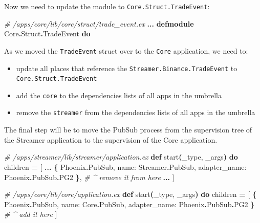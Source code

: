 \documentclass[
  oneside]{book}
\newenvironment{Shaded}{\begin{snugshade}}{\end{snugshade}}
\newcommand{\CommentTok}[1]{\textcolor[rgb]{0.56,0.35,0.01}{\textit{#1}}}
\newcommand{\ConstantTok}[1]{\textcolor[rgb]{0.56,0.35,0.01}{#1}}
\newcommand{\FunctionTok}[1]{\textcolor[rgb]{0.13,0.29,0.53}{\textbf{#1}}}
\newcommand{\KeywordTok}[1]{\textcolor[rgb]{0.13,0.29,0.53}{\textbf{#1}}}
\newcommand{\NormalTok}[1]{#1}
\newcommand{\OperatorTok}[1]{\textcolor[rgb]{0.81,0.36,0.00}{\textbf{#1}}}
\newcommand{\OtherTok}[1]{\textcolor[rgb]{0.56,0.35,0.01}{#1}}
\newcommand{\VariableTok}[1]{\textcolor[rgb]{0.00,0.00,0.00}{#1}}
\providecommand{\tightlist}{%
  \setlength{\itemsep}{0pt}\setlength{\parskip}{0pt}}
\begin{document}
Now we need to update the module to \texttt{Core.Struct.TradeEvent}:

\begin{Shaded}
\begin{Highlighting}[]
\CommentTok{\# /apps/core/lib/core/struct/trade\_event.ex}
\OperatorTok{...}
\KeywordTok{defmodule} \ConstantTok{Core}\OperatorTok{.}\ConstantTok{Struct}\OperatorTok{.}\ConstantTok{TradeEvent} \KeywordTok{do}
\end{Highlighting}
\end{Shaded}

As we moved the \texttt{TradeEvent} struct over to the \texttt{Core} application, we need to:

\begin{itemize}
\tightlist
\item
  update all places that reference the \texttt{Streamer.Binance.TradeEvent} to \texttt{Core.Struct.TradeEvent}
\item
  add the \texttt{core} to the dependencies lists of all apps in the umbrella
\item
  remove the \texttt{streamer} from the dependencies lists of all apps in the umbrella
\end{itemize}

The final step will be to move the PubSub process from the supervision tree of the Streamer application to the supervision of the Core application.

\begin{Shaded}
\begin{Highlighting}[]
\CommentTok{\# /apps/streamer/lib/streamer/application.ex}
  \KeywordTok{def}\NormalTok{ start}\FunctionTok{(}\NormalTok{\_type, \_args}\FunctionTok{)} \KeywordTok{do}
\NormalTok{    children }\OperatorTok{=} \OtherTok{[}
      \OperatorTok{...}
      \FunctionTok{\{}
        \ConstantTok{Phoenix}\OperatorTok{.}\ConstantTok{PubSub}\NormalTok{,}
        \VariableTok{name:} \ConstantTok{Streamer}\OperatorTok{.}\ConstantTok{PubSub}\NormalTok{, }\VariableTok{adapter\_name:} \ConstantTok{Phoenix}\OperatorTok{.}\ConstantTok{PubSub}\OperatorTok{.}\ConstantTok{PG2}
      \FunctionTok{\}}\NormalTok{, }\CommentTok{\# \^{} remove it from here}
      \OperatorTok{...}
    \OtherTok{]}
\end{Highlighting}
\end{Shaded}

\begin{Shaded}
\begin{Highlighting}[]
\CommentTok{\# /apps/core/lib/core/application.ex}
  \KeywordTok{def}\NormalTok{ start}\FunctionTok{(}\NormalTok{\_type, \_args}\FunctionTok{)} \KeywordTok{do}
\NormalTok{    children }\OperatorTok{=} \OtherTok{[}
      \FunctionTok{\{}
        \ConstantTok{Phoenix}\OperatorTok{.}\ConstantTok{PubSub}\NormalTok{,}
        \VariableTok{name:} \ConstantTok{Core}\OperatorTok{.}\ConstantTok{PubSub}\NormalTok{, }\VariableTok{adapter\_name:} \ConstantTok{Phoenix}\OperatorTok{.}\ConstantTok{PubSub}\OperatorTok{.}\ConstantTok{PG2}
      \FunctionTok{\}} \CommentTok{\# \^{} add it here}
    \OtherTok{]}
\end{Highlighting}
\end{Shaded}
\end{document}
